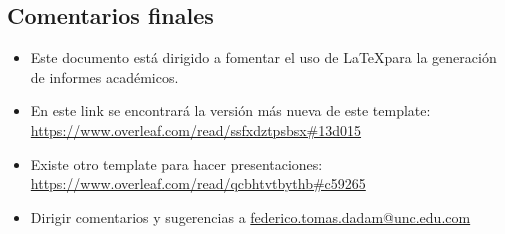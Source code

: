 \subsection{Comentarios finales}

\begin{itemize}
    \item Este documento está dirigido a fomentar el uso de \LaTeX para la generación de informes académicos.
    \item En este link se encontrará la versión más nueva de este template: \url{https://www.overleaf.com/read/ssfxdztpsbsx#13d015}
    \item Existe otro template para hacer presentaciones: \url{https://www.overleaf.com/read/qcbhtvtbythb#c59265}
    \item Dirigir comentarios y sugerencias a \href{mailto:federico.tomas.dadam@unc.edu.com}{federico.tomas.dadam@unc.edu.com}
\end{itemize}
